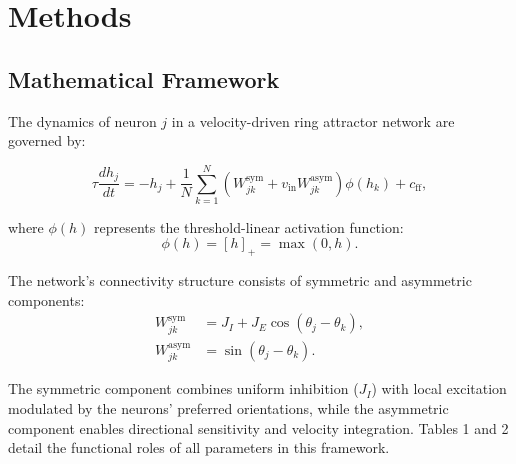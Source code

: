 \documentclass[11pt,a4paper]{article}
\begin{document}
\section{Methods}
\subsection{Mathematical Framework}
The dynamics of neuron \( j \) in a velocity-driven ring attractor network are governed by:

\begin{equation}
\tau \frac{d h_j}{dt} = -h_j + \frac{1}{N} \sum_{k=1}^N \left( W^{\text{sym}}_{jk} + v_{\text{in}} W^{\text{asym}}_{jk} \right) \phi(h_k) + c_{\text{ff}},
\label{eq:ring_dynamics}
\end{equation}

where \(\phi(h)\) represents the threshold-linear activation function:
\[
\phi(h) = [h]_+ = \max(0, h).
\]

The network's connectivity structure consists of symmetric and asymmetric components:
\begin{align}
W^{\text{sym}}_{jk} &= J_I + J_E \cos(\theta_j - \theta_k), \\
W^{\text{asym}}_{jk} &= \sin(\theta_j - \theta_k).
\end{align}

The symmetric component combines uniform inhibition (\(J_I\)) with local excitation modulated by the neurons' preferred orientations, while the asymmetric component enables directional sensitivity and velocity integration. Tables 1 and 2 detail the functional roles of all parameters in this framework.

\end{document}
